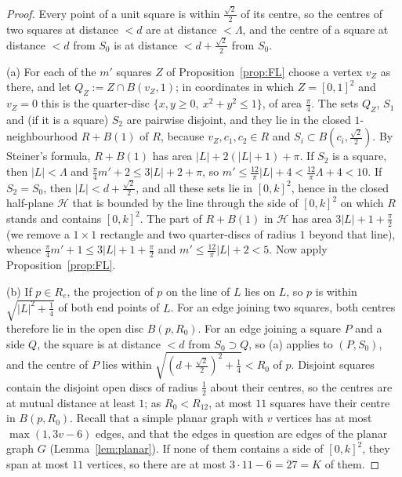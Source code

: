 \documentclass[11pt]{amsart}
\theoremstyle{definition}
\theoremstyle{remark}
\begin{document}
\begin{proof}
Every point of a unit square is within $\frac{\sqrt2}2$ of its centre, so the centres of two squares at distance $<d$ are
at distance $<\Lambda$, and the centre of a square at distance $<d$ from $S_0$ is at distance $<d+\frac{\sqrt2}2$ from
$S_0$.

(a) For each of the $m'$ squares $Z$ of Proposition~\ref{prop:FL} choose a vertex $v_Z$ as there, and let
$Q_Z:=Z\cap B(v_Z,1)$; in coordinates in which $Z=[0,1]^2$ and $v_Z=0$ this is the quarter-disc $\{x,y\ge0,\ x^2+y^2\le1\}$,
of area $\frac\pi4$. The sets $Q_Z$, $S_1$ and (if it is a square) $S_2$ are pairwise disjoint, and they lie in the closed
$1$-neighbourhood $R+B(1)$ of $R$, because $v_Z,c_1,c_2\in R$ and $S_i\subset B(c_i,\frac{\sqrt2}2)$. By Steiner's formula,
$R+B(1)$ has area $|L|+2(|L|+1)+\pi$. If $S_2$ is a square, then $|L|<\Lambda$ and
$\frac\pi4m'+2\le3|L|+2+\pi$, so $m'\le\frac{12}\pi|L|+4<\frac{12}\pi\Lambda+4<10$. If $S_2=S_0$, then $|L|<d+\frac{\sqrt2}2$, and
all these sets lie in $[0,k]^2$, hence in the closed half-plane $\mathcal H$ that is bounded by the line through the side of
$[0,k]^2$ on which $R$ stands and contains $[0,k]^2$. The part of $R+B(1)$ in $\mathcal H$ has area $3|L|+1+\frac\pi2$ (we remove a
$1\times1$ rectangle and two quarter-discs of radius $1$ beyond that line), whence $\frac\pi4m'+1\le3|L|+1+\frac\pi2$ and
$m'\le\frac{12}\pi|L|+2<5$. Now apply Proposition~\ref{prop:FL}.

(b) If $p\in R_e$, the projection of $p$ on the line of $L$ lies on $L$, so $p$ is within $\sqrt{|L|^2+\frac14}$ of both
end points of $L$. For an edge joining two squares, both centres therefore lie in the open disc $B(p,R_0)$. For an edge
joining a square $P$ and a side $Q$, the square is at distance $<d$ from $S_0\supset Q$, so (a) applies to $(P,S_0)$, and the
centre of $P$ lies within $\sqrt{(d+\frac{\sqrt2}2)^2+\frac14}<R_0$ of $p$. Disjoint squares contain the disjoint open discs of
radius $\frac12$ about their centres, so the centres are at mutual distance at least $1$; as $R_0<R_{12}$, at most $11$
squares have their centre in $B(p,R_0)$. Recall that a simple planar graph with $v$ vertices has at most $\max(1,3v-6)$ edges, and that the edges in question are edges of the planar graph $G$ (Lemma~\ref{lem:planar}).
If none of them contains a side of $[0,k]^2$, they span at most $11$ vertices, so there are at most $3\cdot11-6=27=K$ of them.


\end{proof}
\end{document}
